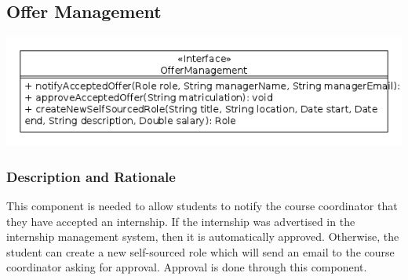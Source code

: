 \documentclass{l3deliverable}
\begin{document}
\subsection{Offer Management}
\includegraphics[scale = 0.5]{OfferManagement.png}
\subsubsection{Description and Rationale}
This component is needed to allow students to notify the course coordinator that they have accepted an internship. If the internship was advertised in the internship management system, then it is automatically approved. Otherwise, the student can create a new self-sourced role which will send an email to the course coordinator asking for approval. Approval is done through this component.
\end{document}
